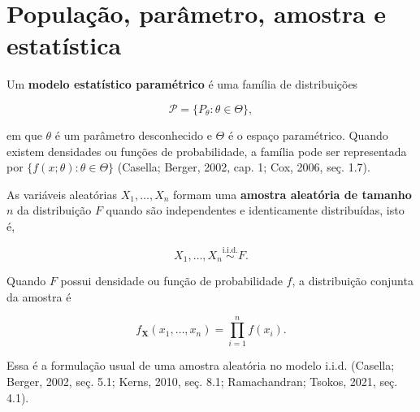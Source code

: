 \documentclass[
  letterpaper,
  DIV=11,
  numbers=noendperiod]{scrreprt}
\begin{document}
\section{População, parâmetro, amostra e
estatística}\label{populauxe7uxe3o-paruxe2metro-amostra-e-estatuxedstica}

\begin{tcolorbox}[enhanced jigsaw, colback=white, leftrule=.75mm, colbacktitle=quarto-callout-important-color!10!white, breakable, titlerule=0mm, bottomtitle=1mm, title=\textcolor{quarto-callout-important-color}{\faExclamation}\hspace{0.5em}{Definição --- Modelo estatístico e parâmetro}, colframe=quarto-callout-important-color-frame, toprule=.15mm, opacityback=0, bottomrule=.15mm, opacitybacktitle=0.6, arc=.35mm, toptitle=1mm, rightrule=.15mm, coltitle=black, left=2mm]

Um \textbf{modelo estatístico paramétrico} é uma família de
distribuições

\[\mathcal{P}=\{P_\theta:\theta\in\Theta\},\]

em que \(\theta\) é um parâmetro desconhecido e \(\Theta\) é o espaço
paramétrico. Quando existem densidades ou funções de probabilidade, a
família pode ser representada por \(\{f(x;\theta):\theta\in\Theta\}\)
(Casella; Berger, 2002, cap. 1; Cox, 2006, seç. 1.7).

\end{tcolorbox}

\begin{tcolorbox}[enhanced jigsaw, colback=white, leftrule=.75mm, colbacktitle=quarto-callout-important-color!10!white, breakable, titlerule=0mm, bottomtitle=1mm, title=\textcolor{quarto-callout-important-color}{\faExclamation}\hspace{0.5em}{Definição --- Amostra aleatória no modelo i.i.d.}, colframe=quarto-callout-important-color-frame, toprule=.15mm, opacityback=0, bottomrule=.15mm, opacitybacktitle=0.6, arc=.35mm, toptitle=1mm, rightrule=.15mm, coltitle=black, left=2mm]

As variáveis aleatórias \(X_1,\ldots,X_n\) formam uma \textbf{amostra
aleatória de tamanho} \(n\) da distribuição \(F\) quando são
independentes e identicamente distribuídas, isto é,

\[X_1,\ldots,X_n\overset{\mathrm{i.i.d.}}{\sim}F.\]

Quando \(F\) possui densidade ou função de probabilidade \(f\), a
distribuição conjunta da amostra é

\[f_{\mathbf{X}}(x_1,\ldots,x_n)
=
\prod_{i=1}^n f(x_i).\]

Essa é a formulação usual de uma amostra aleatória no modelo i.i.d.
(Casella; Berger, 2002, seç. 5.1; Kerns, 2010, seç. 8.1; Ramachandran;
Tsokos, 2021, seç. 4.1).

\end{tcolorbox}
\end{document}
